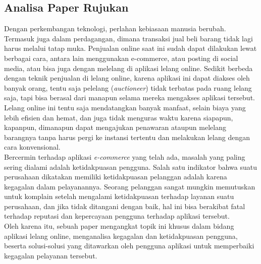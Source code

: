 
    \subsection{Analisa Paper Rujukan}
	    \label{analisa-paper-rujukan}
	    Dengan perkembangan teknologi, perlahan kebiasaan manusia berubah. Termasuk juga dalam perdagangan, dimana transaksi jual beli barang tidak lagi harus melalui tatap muka. Penjualan online saat ini sudah dapat dilakukan lewat berbagai cara, antara lain menggunakan e-commerce, atau posting di social media, atau bisa juga dengan melelang di aplikasi lelang online. Sedikit berbeda dengan teknik penjualan di lelang online, karena aplikasi ini dapat diakses oleh banyak orang, tentu saja pelelang (\textit{auctioneer}) tidak terbatas pada ruang lelang saja, tapi bisa berasal dari manapun selama mereka mengakses aplikasi tersebut.  Lelang online ini tentu saja mendatangkan banyak manfaat, selain biaya yang lebih efisien dan hemat, dan juga tidak menguras waktu karena siapapun, kapanpun, dimanapun dapat mengajukan penawaran ataupun melelang barangnya tanpa harus pergi ke instansi tertentu dan melakukan lelang dengan cara konvensional.\\
		\indent Bercermin terhadap aplikasi \textit{e-commerce} yang telah ada, masalah yang paling sering dialami adalah ketidakpuasan pengguna. Salah satu indikator bahwa suatu perusahaan dikatakan memiliki ketidakpuasan pelanggan adalah karena kegagalan dalam pelayanannya. Seorang pelanggan sangat mungkin memutuskan untuk komplain setelah mengalami ketidakpuasan terhadap layanan suatu perusahaan, dan jika tidak ditangani dengan baik, hal ini bisa berakibat fatal terhadap reputasi dan kepercayaan pengguna terhadap aplikasi tersebut. \\
		\indent Oleh karena itu, sebuah paper mengangkat topik ini khusus dalam bidang aplikasi lelang online, menganalisa kegagalan dan ketidakpuasan pengguna, beserta solusi-solusi yang ditawarkan oleh pengguna aplikasi untuk memperbaiki kegagalan pelayanan tersebut. 
		
